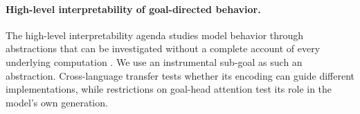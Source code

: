\paragraph{High-level interpretability of goal-directed behavior.} The high-level interpretability agenda studies model behavior through abstractions that can be investigated without a complete account of every underlying computation \citep{greenblatt2024highlevel}. We use an instrumental sub-goal as such an abstraction. Cross-language transfer tests whether its encoding can guide different implementations, while restrictions on goal-head attention test its role in the model's own generation.
